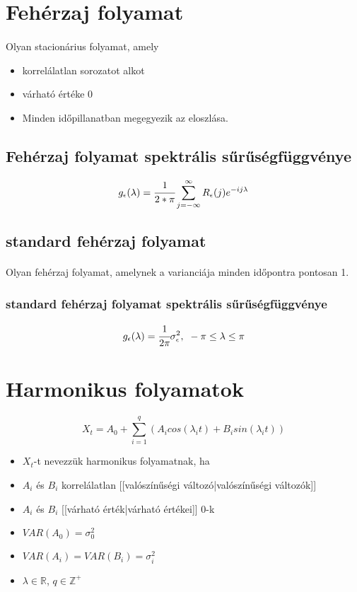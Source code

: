 \documentclass[11pt,a4pape,draftr]{article}
\begin{document}
		\section{Fehérzaj folyamat}
			\paragraph{}
				Olyan stacionárius folyamat, amely
				\begin{itemize}
					\item korrelálatlan sorozatot alkot
					\item várható értéke 0
					\item Minden időpillanatban megegyezik az eloszlása.
				\end{itemize}
			\subsection{Fehérzaj folyamat spektrális sűrűségfüggvénye}
				$$g_\epsilon (\lambda) = \cfrac{1}{2* \pi} \sum_{j = - \infty}^{\infty} R_{\epsilon}(j)e^{-i j \lambda}$$
			\subsection{standard fehérzaj folyamat}
				\paragraph{}
					Olyan fehérzaj folyamat, amelynek a varianciája minden időpontra pontosan 1.
			\subsubsection{standard fehérzaj folyamat spektrális sűrűségfüggvénye}
				$$g_\epsilon(\lambda) = \cfrac{1}{2 \pi} \sigma^2_\epsilon, \\\ -\pi \le \lambda \le \pi$$
		\section{Harmonikus folyamatok}
			\paragraph{}
				$$X_t = A_0 + \sum_{i=1}^q (A_i cos(\lambda_i t) + B_i sin(\lambda_i t))$$
				\begin{itemize}
					\item $X_t$-t nevezzük harmonikus folyamatnak, ha
					\item $A_i$ és $B_i$ korrelálatlan [[valószínűségi változó|valószínűségi változók]]
					\item $A_i$ és $B_i$ [[várható érték|várható értékei]] 0-k
					\item $VAR(A_0) = \sigma_0^2$
					\item $VAR(A_i)= VAR(B_i) = \sigma_i^2$
					\item $\lambda \in \mathbb{R}$, $q \in \mathbb{Z}^+$
				\end{itemize}
\end{document}
